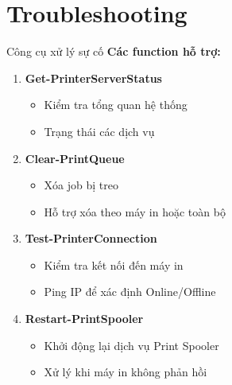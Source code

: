 \documentclass{beamer}
\begin{document}
    \section{Troubleshooting}
    \begin{frame}{Công cụ xử lý sự cố}
        \textbf{Các function hỗ trợ:}
        \begin{enumerate}
            \item \textbf{Get-PrinterServerStatus}
                \begin{itemize}
                    \item Kiểm tra tổng quan hệ thống
                    \item Trạng thái các dịch vụ
                \end{itemize}
            \item \textbf{Clear-PrintQueue}
                \begin{itemize}
                    \item Xóa job bị treo
                    \item Hỗ trợ xóa theo máy in hoặc toàn bộ
                \end{itemize}
            \item \textbf{Test-PrinterConnection}
                \begin{itemize}
                    \item Kiểm tra kết nối đến máy in
                    \item Ping IP để xác định Online/Offline
                \end{itemize}
            \item \textbf{Restart-PrintSpooler}
                \begin{itemize}
                    \item Khởi động lại dịch vụ Print Spooler
                    \item Xử lý khi máy in không phản hồi
                \end{itemize}
        \end{enumerate}
    \end{frame}
\end{document}
